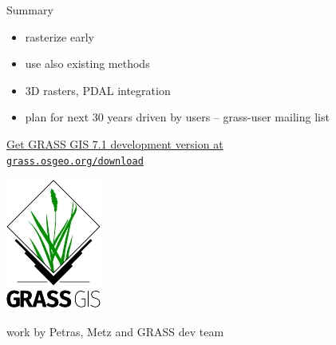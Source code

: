 \documentclass[xcolor={dvipsnames,usenames},beamer,aspectratio=169]{beamer}
\begin{document}
\begin{frame}{}

\vspace*{0.05\textheight}

\begin{block}{Summary}
 \begin{itemize}
  \item rasterize early
  \item use also existing methods
  \item 3D rasters, PDAL integration
  \item plan for next 30 years driven by users -- grass-user mailing list
 \end{itemize}
\end{block}

\bigskip

\centering
\href{https://grass.osgeo.org/download/}{%
Get GRASS GIS 7.1 development version at\\
\texttt{grass.osgeo.org/download}%
}

\smallskip

\includegraphics[height=0.25\textheight]{logos/grass_gis}

work by Petras, Metz and GRASS dev team


\end{frame}
\end{document}
